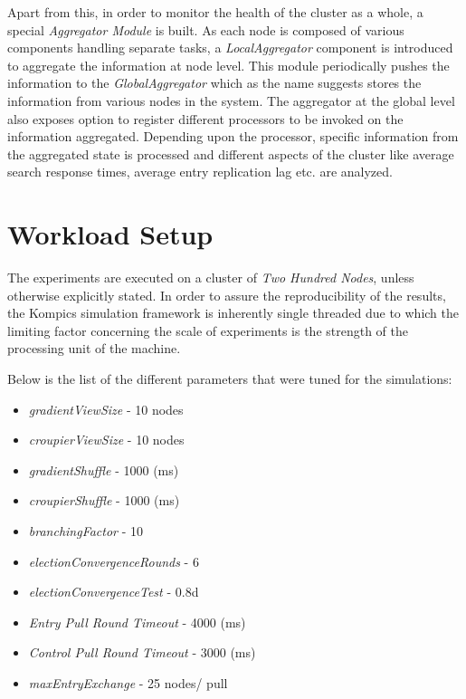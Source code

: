 \documentclass[a4paper,11pt]{kth-mag}
\begin{document}
\par Apart from this, in order to monitor the health of the cluster as a whole, a special \textit{Aggregator Module} is built. As each node is composed of various components handling separate tasks, a \textit{LocalAggregator} component is introduced to aggregate the information at node level. This module periodically pushes the information to the \textit{GlobalAggregator} which as the name suggests stores the information from various nodes in the system. The aggregator at the global level also exposes option to register different processors to be invoked on the information aggregated. Depending upon the processor, specific information from the aggregated state is processed and different aspects of the cluster like average search response times, average entry replication lag etc. are analyzed.  


\section{Workload Setup}

The experiments are executed on a cluster of \textit{Two Hundred Nodes}, unless otherwise explicitly stated. In order to assure the reproducibility of the results, the Kompics simulation framework is inherently single threaded due to which the limiting factor concerning the scale of experiments is the strength of the processing unit of the machine.

\par Below is the list of the different parameters that were tuned for the simulations:

\begin{itemize}
\setlength\itemsep{0em}
\item \textit{gradientViewSize} - 10 nodes
\item \textit{croupierViewSize} - 10 nodes
\item \textit{gradientShuffle} - 1000 (ms)
\item \textit{croupierShuffle} - 1000 (ms)
\item \textit{branchingFactor} - 10
\item \textit{electionConvergenceRounds} - 6
\item \textit{electionConvergenceTest} - 0.8d
\item \textit{Entry Pull Round Timeout} - 4000 (ms)
\item \textit{Control Pull Round Timeout} - 3000 (ms)
\item \textit{maxEntryExchange} - 25 nodes/ pull
\end{itemize}
\end{document}
